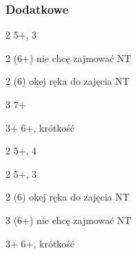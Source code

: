 \documentclass[12pt, a4paper]{article}
\begin{document}
\subsubsection*{Dodatkowe}
\sequence{{1\clubs}{1\hearts}{2\clubs}{2\diams}}
\begin{options}[1]
    \item[2\hearts] 5+\clubs, 3\hearts
    \item[2\spades] (6+) nie chcę zajmować NT
    \item[2\nt] (6) okej ręka do zajęcia NT
    \item[3\clubs] 7+\clubs
    \item[3\diams+] 6+\clubs, krótkość 
\end{options}

\sequence{{1\clubs}{1\spades}{2\clubs}{2\diams}}
\begin{options}[1]
    \item[2\hearts] 5+\clubs, 4\hearts
    \item[2\spades] 5+\clubs, 3\spades
    \item[2\nt] (6) okej ręka do zajęcia NT
    \item[3\clubs] (6+) nie chcę zajmować NT
    \item[3\diams+] 6+\clubs, krótkość 
\end{options}

\pagebreak
\end{document}
